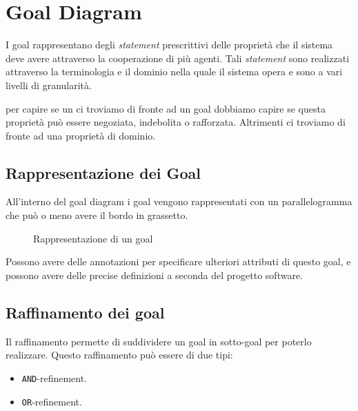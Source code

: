 \chapter{Goal Diagram}
I goal rappresentano degli \textit{statement} prescrittivi delle 
proprietà che il sistema deve avere attraverso la cooperazione 
di più agenti. Tali \textit{statement} sono realizzati attraverso la 
terminologia e il dominio nella quale il sistema opera e 
sono a vari livelli di granularità.

per capire se un ci troviamo di fronte ad un goal dobbiamo capire 
se questa proprietà può essere negoziata, indebolita o rafforzata.
Altrimenti ci troviamo di fronte ad una proprietà 
di dominio.


\section{Rappresentazione dei Goal}
All'interno del goal diagram i goal vengono rappresentati con 
un parallelogramma che può o meno avere il bordo in grassetto.
\begin{figure}[H]
    \centering
    \caption{Rappresentazione di un goal}
\end{figure}
Possono avere delle annotazioni per specificare ulteriori attributi 
di questo goal, e possono avere delle precise definizioni a 
seconda del progetto software.

\section{Raffinamento dei goal}
Il raffinamento permette di suddividere un goal in sotto-goal
per poterlo realizzare. Questo raffinamento può essere di due tipi:
\begin{itemize}
    \item \texttt{AND}-refinement.
    \item \texttt{OR}-refinement.
\end{itemize}
